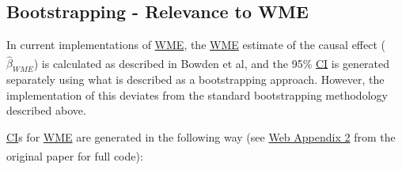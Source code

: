 \documentclass[
]{article}
\begin{document}
\newpage

\subsection{Bootstrapping - Relevance to WME}\label{bootstrapping---relevance-to-wme}

In current implementations of \hyperref[acronyms_WME]{WME}, the \hyperref[acronyms_WME]{WME} estimate of the causal effect (\(\hat{\beta}_{WME}\)) is calculated as described in Bowden et al\textsuperscript{}, and the 95\% \hyperref[acronyms_CI]{CI} is generated separately using what is described as a bootstrapping approach. However, the implementation of this deviates from the standard bootstrapping methodology described above.

\hyperref[acronyms_CI]{CI}s for \hyperref[acronyms_WME]{WME} are generated in the following way (see \href{https://research-information.bris.ac.uk/ws/portalfiles/portal/101612595/Bowden_et_al_2016_Genetic_Epidemiology.sup_1.pdf}{Web Appendix 2} from the original paper\textsuperscript{} for full code):
\end{document}
